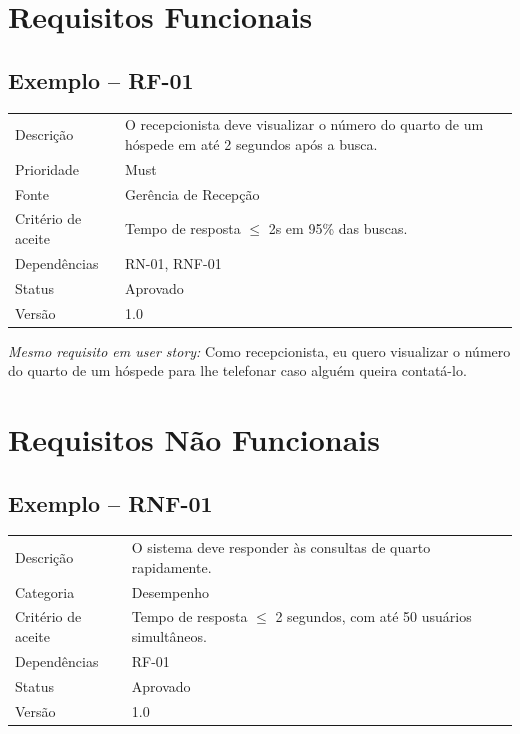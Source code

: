 \documentclass[12pt,a4paper]{article}
\begin{document}
\section{Requisitos Funcionais}
\subsection*{Exemplo -- RF-01}
\begin{longtable}{L{3cm} L{9.5cm}}
\toprule
{}
 \\
\midrule
Descrição & O recepcionista deve visualizar o número do quarto de um hóspede em até 2 segundos após a busca. \\
Prioridade & Must \\
Fonte & Gerência de Recepção \\
Critério de aceite & Tempo de resposta $\leq$ 2s em 95\% das buscas. \\
Dependências & RN-01, RNF-01 \\
Status & Aprovado \\
Versão & 1.0 \\
\bottomrule
\end{longtable}

\textit{Mesmo requisito em user story:} Como recepcionista, eu quero visualizar o número do quarto de um hóspede para lhe telefonar caso alguém queira contatá-lo.

\section{Requisitos Não Funcionais}
\subsection*{Exemplo -- RNF-01}
\begin{longtable}{L{3cm} L{9.5cm}}
\toprule
{}
 \\
\midrule
Descrição & O sistema deve responder às consultas de quarto rapidamente. \\
Categoria & Desempenho \\
Critério de aceite & Tempo de resposta $\leq$ 2 segundos, com até 50 usuários simultâneos. \\
Dependências & RF-01 \\
Status & Aprovado \\
Versão & 1.0 \\
\bottomrule
\end{longtable}
\end{document}
